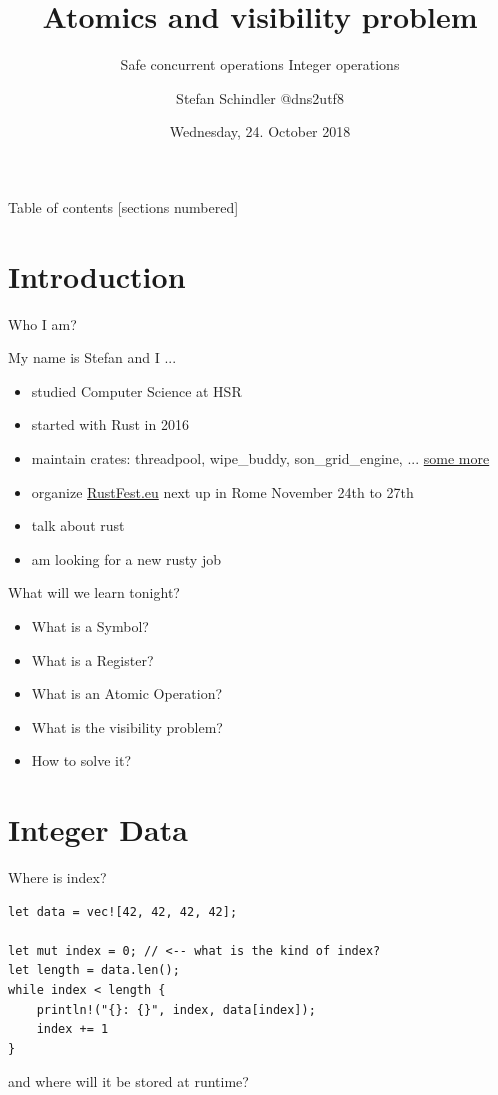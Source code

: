 \documentclass[10pt,aspectratio=169]{beamer}
\title{Atomics and visibility problem}
\subtitle{Safe concurrent operations Integer operations}
\date{Wednesday, 24. October 2018}
\author{Stefan Schindler @dns2utf8}
\institute{\href{https://www.meetup.com/de-DE/Rust-Zurich/}{Rust Zürichsee Meetup} hosted by \href{https://coredump.ch}{coredump.ch}}
\begin{document}
\maketitle

\begin{frame}{Table of contents}
  [sections numbered]
  \tableofcontents[hideallsubsections]
\end{frame}

\section{Introduction}

\begin{frame}[fragile]{Who I am?}

My name is Stefan and I ...

\begin{itemize}
\item studied Computer Science at HSR
\item started with Rust in 2016
\item maintain crates: threadpool, wipe\_buddy, son\_grid\_engine, ... \href{https://crates.io/users/dns2utf8}{some more}
\item organize \href{https://rustfest.eu}{RustFest.eu} next up in Rome November 24th to 27th
\item talk about rust
\item am looking for a new rusty job
\end{itemize}

\end{frame}
\begin{frame}{What will we learn tonight?}
  
\begin{itemize}
\item What is a Symbol?
\item What is a Register?
\item What is an Atomic Operation?
\item What is the visibility problem?
\item How to solve it?
\end{itemize}
\end{frame}

\section{Integer Data}

\begin{frame}[fragile]{Where is index?}

\begin{verbatim}
let data = vec![42, 42, 42, 42];

let mut index = 0; // <-- what is the kind of index?
let length = data.len();
while index < length {
    println!("{}: {}", index, data[index]);
    index += 1
}
\end{verbatim}
and \alert{where} will it be stored at runtime?
\end{frame}
\end{document}
